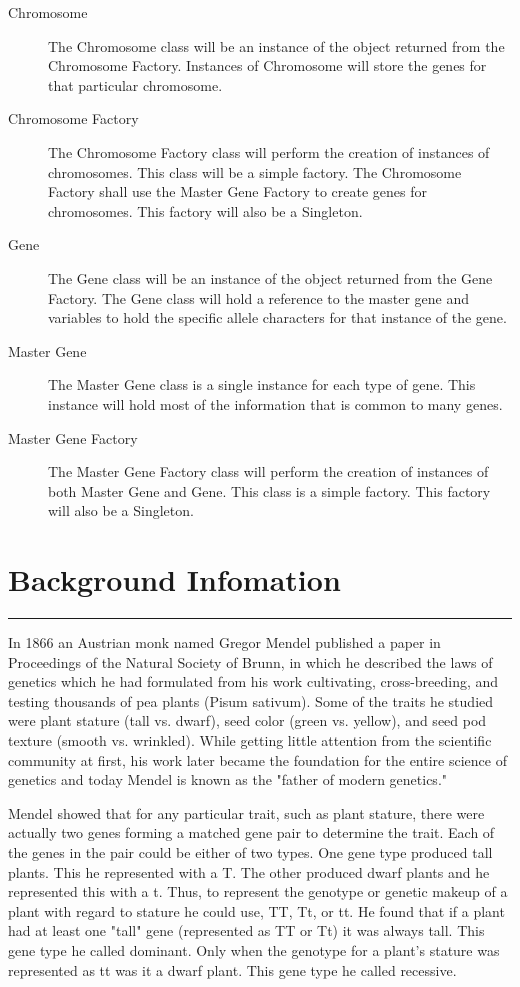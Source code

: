 \documentclass{article}
\begin{document}
\begin{description}
\item[Chromosome] The Chromosome class will be an instance of the object returned from the Chromosome Factory. Instances of Chromosome will store the genes for that particular chromosome. 

\item[Chromosome Factory] The Chromosome Factory class will perform the creation of instances of chromosomes. This class will be a simple factory. The Chromosome Factory shall use the Master Gene Factory to create genes for chromosomes. This factory will also be a Singleton.

\item[Gene] The Gene class will be an instance of the object returned from the Gene Factory. The Gene class will hold a reference to the master gene and variables to hold the specific allele characters for that instance of the gene.

\item[Master Gene] The Master Gene class is a single instance for each type of gene. This instance will hold most of the information that is common to many genes.

\item[Master Gene Factory] The Master Gene Factory class will perform the creation of instances of both Master Gene and Gene. This class is a simple factory. This factory will also be a Singleton.

\end{description}

\section{Background Infomation}
\hrule
In 1866 an Austrian monk named Gregor Mendel published a paper in Proceedings of the Natural Society of Brunn, in which he described the laws of genetics which he had formulated from his work cultivating, cross-breeding, and testing thousands of pea plants (Pisum sativum). Some of the traits he studied were plant stature (tall vs. dwarf), seed color (green vs. yellow), and seed pod texture (smooth vs. wrinkled). While getting little attention from the scientific community at first, his work later became the foundation for the entire science of genetics and today Mendel is known as the "father of modern genetics."

Mendel showed that for any particular trait, such as plant stature, there were actually two genes forming a matched gene pair to determine the trait. Each of the genes in the pair could be either of two types. One gene type produced tall plants. This he represented with a T. The other produced dwarf plants and he represented this with a t. Thus, to represent the genotype or genetic makeup of a plant with regard to stature he could use, TT, Tt, or tt. He found that if a plant had at least one "tall" gene (represented as TT or Tt) it was always tall. This gene type he called dominant. Only when the genotype for a plant’s stature was represented as tt was it a dwarf plant. This gene type he called recessive. 
\end{document}
